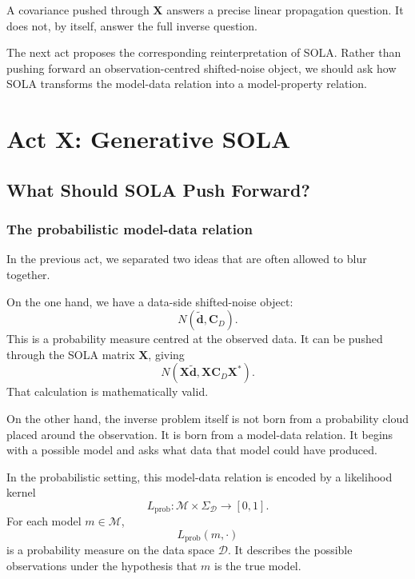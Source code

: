 \documentclass[11pt,openany]{book}
\theoremstyle{definition}
\theoremstyle{remark}
\newcommand{\M}{\mathcal M}
\newcommand{\D}{\mathcal D}
\begin{document}
\begin{lessonbox}
A covariance pushed through \(\mathbf X\) answers a precise linear propagation question. It does
not, by itself, answer the full inverse question.
\end{lessonbox}

The next act proposes the corresponding reinterpretation of SOLA. Rather than pushing forward
an observation-centred shifted-noise object, we should ask how SOLA transforms the model-data
relation into a model-property relation.



\part{Act X: Generative SOLA}

\chapter{What Should SOLA Push Forward?}

\section{The probabilistic model-data relation}

In the previous act, we separated two ideas that are often allowed to blur together.

On the one hand, we have a data-side shifted-noise object:
\[
  N(\widetilde{\mathbf d},\mathbf C_D).
\]
This is a probability measure centred at the observed data. It can be pushed through the SOLA
matrix \(\mathbf X\), giving
\[
  N(\mathbf X\widetilde{\mathbf d},\mathbf X\mathbf C_D\mathbf X^*).
\]
That calculation is mathematically valid.

On the other hand, the inverse problem itself is not born from a probability cloud placed around
the observation. It is born from a model-data relation. It begins with a possible model and asks
what data that model could have produced.

In the probabilistic setting, this model-data relation is encoded by a likelihood kernel
\[
  L_{\mathrm{prob}}:\M\times\Sigma_{\D}\to[0,1].
\]
For each model \(m\in\M\),
\[
  L_{\mathrm{prob}}(m,\cdot)
\]
is a probability measure on the data space \(\D\). It describes the possible observations under
the hypothesis that \(m\) is the true model.
\end{document}
